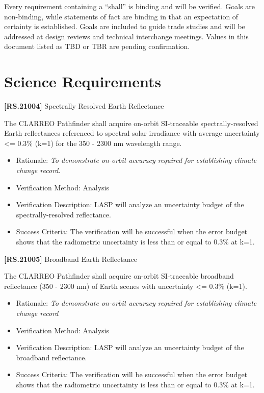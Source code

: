 \documentclass[12pt,oneside,oldfontcommands]{memoir}
\begin{document}
Every requirement containing a ``shall'' is binding and will be verified. Goals are non-binding, while statements of fact are binding in that an expectation of certainty is established. Goals are included to guide trade studies and will be addressed at design reviews and technical interchange meetings. Values in this document listed as TBD or TBR are pending confirmation.

\section{Science Requirements}
\label{sciencerequirements}

\textbf{[RS.21004]} Spectrally Resolved Earth Reflectance

The \gls{CLARREO} Pathfinder shall acquire on-orbit \gls{SI}-traceable spectrally-resolved Earth reflectances referenced to spectral solar irradiance with average uncertainty <= 0.3\% (k=1) for the 350 - 2300 nm wavelength range.

\begin{itemize}
\item{} Rationale: \emph{To demonstrate on-orbit accuracy required for establishing climate change record.}

\item{} Verification Method: Analysis

\item{} Verification Description: \gls{LASP} will analyze an uncertainty budget of the spectrally-resolved reflectance.

\item{} Success Criteria: The verification will be successful when the error budget shows that the radiometric uncertainty is less than or equal to 0.3\% at k=1.

\end{itemize}

\textbf{[RS.21005]} Broadband Earth Reflectance

The \gls{CLARREO} Pathfinder shall acquire on-orbit \gls{SI}-traceable broadband reflectance (350 - 2300 nm) of Earth scenes with uncertainty <= 0.3\% (k=1).

\begin{itemize}
\item{} Rationale: \emph{To demonstrate on-orbit accuracy required for establishing climate change record}

\item{} Verification Method: Analysis

\item{} Verification Description: \gls{LASP} will analyze an uncertainty budget of the broadband reflectance.

\item{} Success Criteria: The verification will be successful when the error budget shows that the radiometric uncertainty is less than or equal to 0.3\% at k=1.

\end{itemize}
\end{document}
